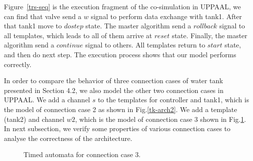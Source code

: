Figure~\ref{trs-seq} is the execution fragment of the co-simulation in UPPAAL, we can find that valve send a $w$ signal to perform data exchange with tank1. After that tank1 move to $dostep$ state. The master algorithm send a $rollback$ signal to all templates, which leads to all of them arrive at $reset$ state. Finally, the master algorithm send a $continue$ signal to others. All templates return to $start$ state, and then do next step. The execution process shows that our model performs correctly.

In order to compare the behavior of three connection cases of water tank presented in Section 4.2, we also model the other two connection cases in UPPAAL. We add a channel $s$ to the templates for controller and tank1, which is the model of connection case 2 as shown in Fig.\ref{tk-arch2}. We add a template (tank2) and channel $w2$, which is the model of connection case 3 shown in Fig.\ref{arc3}. In next subsection, we verify some properties of various connection cases to analyse the correctness of the architecture.
\begin{figure}[htbp]
\end{figure}
\begin{figure}[htbp]
	\caption{Timed automata for connection case 3.}\label{arc3}
\end{figure}
